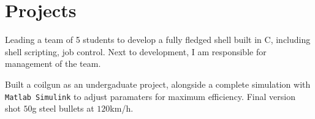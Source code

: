 \section{Projects}

\begin{cv_content}

\begin{minipage}{.1\textwidth}
\end{minipage}
\begin{minipage}{.9\textwidth}
Leading a team of 5 students to develop a fully fledged shell built in C, including shell scripting, job control. Next to development, I am responsible for management of the team.
\end{minipage}

	\vspace{1em}

\begin{minipage}{.1\textwidth}
\end{minipage}
\begin{minipage}{.9\textwidth}
Built a coilgun as an undergaduate project, alongside a complete simulation with \texttt{Matlab Simulink} to adjust paramaters for maximum efficiency. Final version shot $50$g steel bullets at $120$km/h.
\end{minipage}

\end{cv_content}
